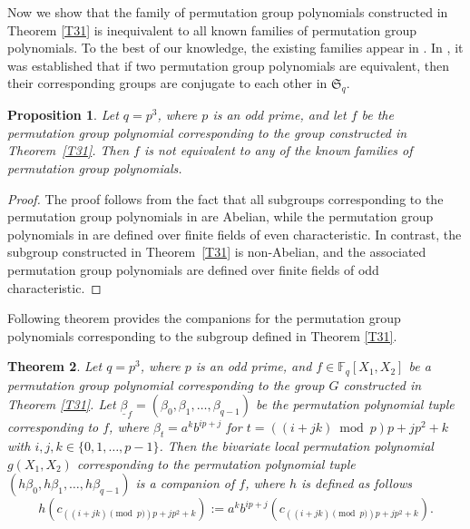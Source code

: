 \documentclass[11pt]{amsart}
\theoremstyle{plain}
\newtheorem{thm}{Theorem}[section]
\newtheorem{prop}[thm]{Proposition}
\numberwithin{equation}{section}
\def\F{{\mathbb F}}
\begin{document}
Now we show that the family of permutation group polynomials constructed in Theorem \ref{T31} is inequivalent to all known families of permutation group polynomials. To the best of our knowledge, the existing families appear in \cite{JJ_2023, HK, HKK}. In \cite[Theorem 3.18]{HK}, it was established that if two permutation group polynomials are equivalent, then their corresponding groups are conjugate to each other in $\mathfrak{S}_q$.
\begin{prop}
Let $q = p^{3}$, where $p$ is an odd prime, and let $f$ be the permutation group polynomial corresponding to the group constructed in Theorem~\ref{T31}. Then $f$ is not equivalent to any of the known families of permutation group polynomials.
\end{prop}
\begin{proof}
The proof follows from the fact that all subgroups corresponding to the permutation group polynomials in \cite{JJ_2023,HKK} are Abelian, while the permutation group polynomials in \cite{HK} are defined over finite fields of even characteristic. In contrast, the subgroup constructed in Theorem~\ref{T31} is non-Abelian, and the associated permutation group polynomials are defined over finite fields of odd characteristic.
\end{proof}
Following theorem provides the companions for the permutation group polynomials corresponding to the subgroup defined in Theorem \ref{T31}.
\begin{thm}\label{T34}
 Let $q=p^3$, where $p$ is an odd prime, and $f\in \F_q[X_1,X_2]$ be a permutation group polynomial corresponding to the group $G$ constructed in Theorem \ref{T31}.  Let $\underline{\beta}_{f} = (\beta_0, \beta_1, \ldots, \beta_{q-1})$ be the permutation polynomial tuple corresponding to $f$, where $\beta_{t} = a^{k} b^{ip+j}$ for $
t = ((i+jk)\bmod p)p + jp^{2} + k$ with $i,j,k \in \{0,1,\ldots,p-1\}$. Then the bivariate local permutation polynomial $g(X_1,X_2)$ corresponding to the permutation polynomial tuple $(h\beta_0, h\beta_1, \ldots, h\beta_{q-1})$ is a companion of $f$, where $h$ is defined as follows
\[
h(c_{\left((i+jk)\pmod  p\right)p+jp^2+k}):=a^{k}b^{ip+j}(c_{\left((i+jk)\pmod  p\right)p+jp^2+k}).
\] \end{thm}
\end{document}

